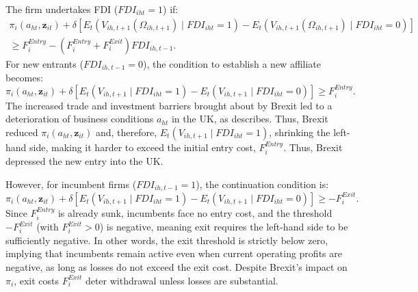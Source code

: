 \documentclass[preprint,11pt,authoryear]{elsarticle}
\begin{document}
The firm undertakes FDI ($FDI_{iht} = 1$) if:
\begin{align}\label{eq:FDIcondition}
    \pi_i(a_{ht}, \mathbf{z}_{it}) 
    + \delta \left[ E_t \left( V_{ih,t+1}(\Omega_{ih,t+1}) \mid FDI_{iht} = 1 \right) 
    - E_t \left( V_{ih,t+1}(\Omega_{ih,t+1}) \mid FDI_{iht} = 0 \right) \right] \\ \nonumber 
    \geq F_i^{Entry} - (F_i^{Entry} + F_i^{Exit}) FDI_{ih,t-1}.
\end{align}
For new entrants ($FDI_{ih,t-1} = 0$), the condition to establish a new affiliate becomes:
\begin{equation}\label{eq:entry}
\pi_i(a_{ht}, \mathbf{z}_{it}) + \delta \left[ E_t \left( V_{ih,t+1} \mid FDI_{iht} = 1 \right) - E_t \left( V_{ih,t+1} \mid FDI_{iht} = 0 \right) \right] \geq F_i^{Entry}.
\end{equation}
The increased trade and investment barriers brought about by Brexit led to a deterioration of business conditions $a_{ht}$ in the UK, as \cite{dhingra2022expecting} describes. Thus, Brexit reduced $\pi_i(a_{ht}, \mathbf{z}_{it})$ and, therefore, $E_t \left( V_{ih,t+1} \mid FDI_{iht} = 1 \right)$, shrinking the left-hand side, making it harder to exceed the initial entry cost, $F_i^{Entry}$. Thus, Brexit depressed the new entry into the UK.

However, for incumbent firms ($FDI_{ih,t-1} = 1$), the continuation condition is:
\begin{equation}\label{eq:exit}
    \pi_i(a_{ht}, \mathbf{z}_{it}) + \delta \left[ E_t \left( V_{ih,t+1} \mid FDI_{iht} = 1 \right) - E_t \left( V_{ih,t+1} \mid FDI_{iht} = 0 \right) \right] \geq -F_i^{Exit}.
\end{equation}
Since $F_i^{Entry}$ is already sunk, incumbents face no entry cost, and the threshold $-F_i^{Exit}$ (with $F_i^{Exit} > 0$) is negative, meaning exit requires the left-hand side to be sufficiently negative. 
In other words, the exit threshold is strictly below zero, implying that incumbents remain active even when current operating profits are negative, as long as losses do not exceed the exit cost.
Despite Brexit's impact on $\pi_i$, exit costs $F_i^{Exit}$ deter withdrawal unless losses are substantial. 
\end{document}
